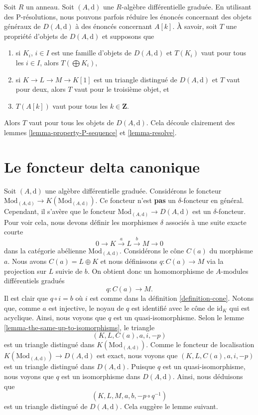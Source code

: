 \begin{remark}
\label{remark-P-resolution}
Soit $R$ un anneau. Soit $(A, \text{d})$ une $R$-algèbre différentielle graduée. En
utilisant des P-résolutions, nous pouvons parfois réduire les énoncés concernant
des objets généraux de $D(A, \text{d})$ à des énoncés concernant $A[k]$. À
savoir, soit $T$ une propriété d'objets de $D(A, \text{d})$ et supposons que
\begin{enumerate}
\item si $K_i$, $i \in I$ est une famille d'objets de $D(A, \text{d})$
et $T(K_i)$ vaut pour tous les $i \in I$, alors $T(\bigoplus K_i)$,
\item si $K \to L \to M \to K[1]$ est un triangle distingué de
$D(A, \text{d})$ et $T$ vaut pour deux, alors $T$
vaut pour le troisième objet, et
\item $T(A[k])$ vaut pour tous les $k \in \mathbf{Z}$.
\end{enumerate}
Alors $T$ vaut pour tous les objets de $D(A, \text{d})$. Cela découle
clairement des lemmes \ref{lemma-property-P-sequence} et \ref{lemma-resolve}.
\end{remark}







\section{Le foncteur delta canonique}
\label{section-canonical-delta-functor}

\noindent
Soit $(A, \text{d})$ une algèbre différentielle
graduée. Considérons le
foncteur $\text{Mod}_{(A, \text{d})} \to K(\text{Mod}_{(A,
\text{d})})$. Ce foncteur n'est {\bf pas} un $\delta$-foncteur en
général. Cependant, il s'avère que le
foncteur $\text{Mod}_{(A, \text{d})} \to D(A, \text{d})$ est
un $\delta$-foncteur. Pour voir cela, nous devons définir
les morphismes $\delta$ associés à une suite exacte courte
$$
0 \to K \xrightarrow{a} L \xrightarrow{b} M \to 0
$$
dans la catégorie abélienne $\text{Mod}_{(A, \text{d})}$.
Considérons le cône $C(a)$ du morphisme $a$. Nous avons $C(a) = L \oplus K$ et
nous définissons $q : C(a) \to M$ via la projection sur $L$ suivie de $b$.
On obtient donc un homomorphisme de $A$-modules différentiels gradués
$$
q : C(a) \longrightarrow M.
$$
Il est clair que $q \circ i = b$ où $i$ est comme
dans la définition
\ref{definition-cone}. Notons que, comme $a$ est injective, le noyau de $q$ est identifié avec le
cône de $\text{id}_K$ qui est acyclique. Ainsi, nous voyons
que $q$ est un quasi-isomorphisme. Selon le
lemme \ref{lemma-the-same-up-to-isomorphisms}, le
triangle
$$
(K, L, C(a), a, i, -p)
$$
est un triangle distingué dans $K(\text{Mod}_{(A, \text{d})})$. Comme
le foncteur de localisation
$K(\text{Mod}_{(A, \text{d})}) \to D(A, \text{d})$ est exact,
nous voyons que $(K, L, C(a), a, i, -p)$ est un triangle distingué
dans $D(A, \text{d})$. Puisque $q$ est un quasi-isomorphisme, nous
voyons que $q$ est un isomorphisme dans $D(A, \text{d})$. Ainsi,
nous déduisons que
$$
(K, L, M, a, b, -p \circ q^{-1})
$$
est un triangle distingué de $D(A,
\text{d})$. Cela suggère le lemme suivant.

